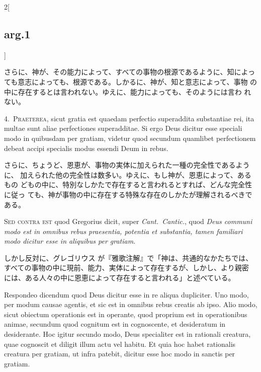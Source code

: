 \documentclass[paper=a4paper,fontsize=10pt,jafontsize=9pt,titlepage]{jlreq}
\begin{document}
\begin{paracol}{2}[\subsection{arg.1}]
\switchcolumn

さらに、神が、その能力によって、すべての事物の根源であるように、知によっ
 ても意志によっても、根源である。しかるに、神が、知と意志によって、事物
 の中に存在するとは言われない。ゆえに、能力によっても、そのようには言わ
 れない。


4.~{\scshape Praeterea}, sicut gratia est quaedam perfectio superaddita
 substantiae rei, ita multae sunt aliae perfectiones superadditae. Si
 ergo Deus dicitur esse speciali modo in quibusdam per gratiam, videtur
 quod secundum quamlibet perfectionem debeat accipi specialis modus
 essendi Deum in rebus.

\switchcolumn

さらに、ちょうど、恩恵が、事物の実体に加えられた一種の完全性であるように、
 加えられた他の完全性は数多い。ゆえに、もし神が、恩恵によって、あるもの
 どもの中に、特別なしかたで存在すると言われるとすれば、どんな完全性に従っ
 ても、神が事物の中に存在する特殊な存在のしかたが理解されるべきである。

\switchcolumn*[\subsection{s.c.}]

{\scshape Sed contra est} quod Gregorius dicit, super {\itshape
 Cant.~Cantic.}, quod {\itshape Deus communi modo est in omnibus rebus
 praesentia, potentia et substantia, tamen familiari modo dicitur esse
 in aliquibus per gratiam}.

\switchcolumn

しかし反対に、グレゴリウス が『雅歌注解』で「神は、共通的なかたちでは、
 すべての事物の中に現前、能力、実体によって存在するが、しかし、より親密
 には、ある人々の中に恩恵によって存在すると言われる」と述べている。

\switchcolumn*

Respondeo dicendum quod Deus dicitur esse in re aliqua dupliciter. Uno
 modo, per modum causae agentis, et sic est in omnibus rebus creatis ab
 ipso. Alio modo, sicut obiectum operationis est in operante, quod
 proprium est in operationibus animae, secundum quod cognitum est in
 cognoscente, et desideratum in desiderante. Hoc igitur secundo modo,
 Deus specialiter est in rationali creatura, quae cognoscit et diligit
 illum actu vel habitu. Et quia hoc habet rationalis creatura per
 gratiam, ut infra patebit, dicitur esse hoc modo in sanctis per
 gratiam.


\end{paracol}
\end{document}
